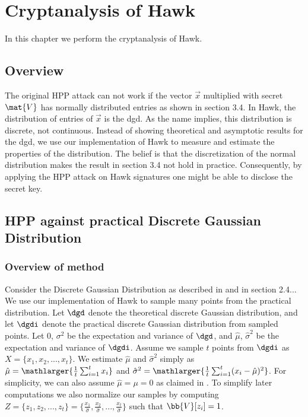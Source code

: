 \chapter{Cryptanalysis of Hawk}
In this chapter we perform the cryptanalysis of Hawk.
\section{Overview}


The original HPP attack can not work if the vector $\vec{x}$ multiplied with secret $\mat{V}$ has normally distributed entries as shown in section 3.4.
In Hawk, the distribution of entries of $\vec{x}$ is the \gls{dgd}. As the name implies, this distribution is discrete, not continuous. 
Instead of showing theoretical and asymptotic results for the \gls{dgd}, we use our implementation of Hawk to measure and estimate the properties of the distribution.
The belief is that the discretization of the normal distribution makes the result in section 3.4 not hold in practice. 
Consequently, by applying the HPP attack on Hawk signatures one might be able to disclose the secret key.

\section{HPP against practical Discrete Gaussian Distribution}
\subsection{Overview of method}
Consider the Discrete Gaussian Distribution as described in \cite{HawkSpec24} and in section 2.4... We use our implementation of Hawk to sample many points from the practical distribution.
Let $\dgd$ denote the theoretical discrete Gaussian distribution, and let $\dgdi$ denote the practical discrete Gaussian distribution from sampled points.
Let $0$, $\sigma^2$ be the expectation and variance of $\dgd$, and $\hat{\mu}$, $\hat{\sigma}^2$ be the expectation and variance of $\dgdi$.
Assume we sample $t$ points from $\dgdi$ as $X = \{x_1, x_2, ..., x_t\}$. We estimate $\hat{\mu}$ and $\hat{\sigma}^2$ simply as $\hat{\mu} = \mathlarger{\frac{1}{t} \sum_{i=1}^{t} x_i}$ and $\hat{\sigma}^2 = \mathlarger{\frac{1}{t} \sum_{i=1}^{t}(x_i - \hat{\mu})^2}$.
For simplicity, we can also assume $\hat{\mu} = \mu = 0$ as claimed in \cite{HawkSpec24}.
To simplify later computations we also normalize our samples by computing $Z = \{z_1, z_2, ..., z_t\} = \{\frac{x_1}{\hat{\sigma}}, \frac{x_2}{\hat{\sigma}},..., \frac{x_t}{\hat{\sigma}}\}$ such that 
$\bb{V}[z_i] = 1$.

